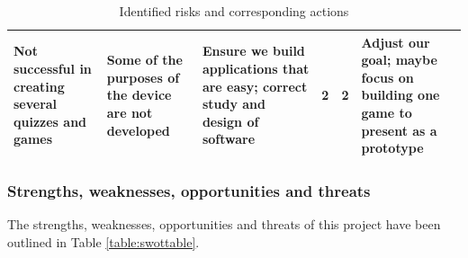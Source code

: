 \documentclass{article}
\begin{document}
\begin{table}[h]
\begin{center}
\begin{small}
\begin{tabular}{|p{3cm}|p{3cm}|p{3cm}|p{1cm}|p{1.2cm}|p{3cm}|}
Not successful in creating several quizzes and games                                              & Some of the purposes of the device are not developed                                                            & Ensure we build applications that are easy; correct study and design of software                                                                                                                          & 2        & 2          & Adjust our goal; maybe focus on building one game to present as a prototype                                                                       \\ \hline
\end{tabular}
\end{small}
\end{center}
\caption{Identified risks and corresponding actions}
\label{table:riskstable}
\end{table}

\subsubsection{Strengths, weaknesses, opportunities and threats}

The strengths, weaknesses, opportunities and threats of this project have been outlined in Table \ref{table:swottable}.
\end{document}
